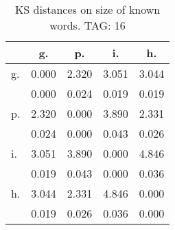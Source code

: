 \begin{table}[h!]
\begin{center}
\begin{tabular}{| l | c | c | c | c |}\hline
 & g. & p. & i. & h. \\\hline
g. & 0.000  & 2.320  & 3.051  & 3.044 \\\hline
 & 0.000  & 0.024  & 0.019  & 0.019 \\\hline
p. & 2.320  & 0.000  & 3.890  & 2.331 \\\hline
 & 0.024  & 0.000  & 0.043  & 0.026 \\\hline
i. & 3.051  & 3.890  & 0.000  & 4.846 \\\hline
 & 0.019  & 0.043  & 0.000  & 0.036 \\\hline
h. & 3.044  & 2.331  & 4.846  & 0.000 \\\hline
 & 0.019  & 0.026  & 0.036  & 0.000 \\\hline
\end{tabular}
\caption{KS distances on size of known words. TAG: 16}
\end{center}
\end{table}